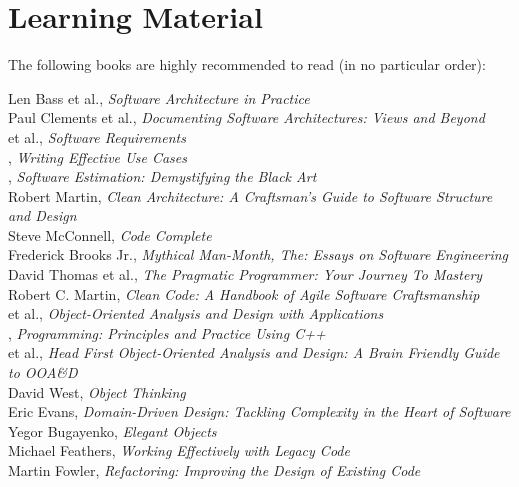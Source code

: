 \documentclass[nobrand,anonymous,nodate,nosecurity]{huawei}
\begin{document}
\newpage
\section*{Learning Material}

The following books are highly recommended to read (in no particular order):

\begin{multicols}{2}\small\raggedright
Len Bass et al., \emph{Software Architecture in Practice}\\[3pt]
Paul Clements et al., \emph{Documenting Software Architectures: Views and Beyond}\\[3pt]
 et al., \emph{Software Requirements}\\[3pt]
{}, \emph{Writing Effective Use Cases}\\[3pt]
{}, \emph{Software Estimation: Demystifying the Black Art}\\[3pt]
{Robert Martin}, \emph{Clean Architecture: A Craftsman's Guide to Software Structure and Design}\\[3pt]
{Steve McConnell}, \emph{Code Complete}\\[3pt]
{Frederick Brooks Jr.}, \emph{Mythical Man-Month, The: Essays on Software Engineering}\\[3pt]
{David Thomas et al.}, \emph{The Pragmatic Programmer: Your Journey To Mastery}\\[3pt]
{Robert C. Martin}, \emph{Clean Code: A Handbook of Agile Software Craftsmanship}\\[3pt]
{ et al.}, \emph{Object-Oriented Analysis and Design with Applications}\\[3pt]
{}, \emph{Programming: Principles and Practice Using C++}\\[3pt]
{ et al.}, \emph{Head First Object-Oriented Analysis and Design: A Brain Friendly Guide to OOA\&D}\\[3pt]
{David West}, \emph{Object Thinking}\\[3pt]
{Eric Evans}, \emph{Domain-Driven Design: Tackling Complexity in the Heart of Software}\\[3pt]
{Yegor Bugayenko}, \emph{Elegant Objects}\\[3pt]
{Michael Feathers}, \emph{Working Effectively with Legacy Code}\\[3pt]
{Martin Fowler}, \emph{Refactoring: Improving the Design of Existing Code}\\[3pt]

\end{multicols}
\end{document}
